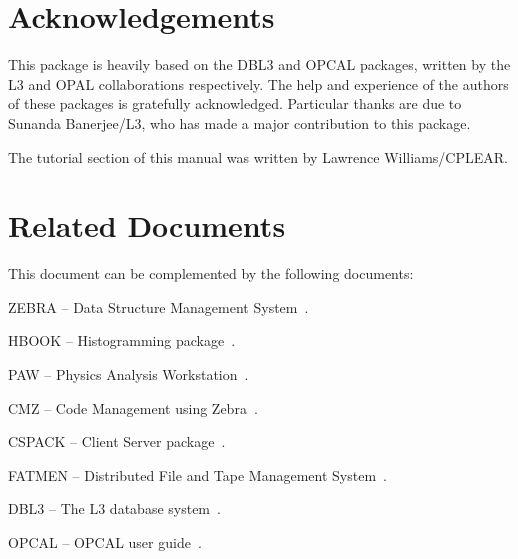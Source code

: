 \section*{Acknowledgements}

This package is heavily based on the DBL3 and OPCAL packages,
written by the L3 and OPAL collaborations respectively.
The help and experience of the authors of these packages
is gratefully acknowledged. Particular thanks are due to
Sunanda Banerjee/L3, who has made a major contribution to
this package.

The tutorial section of this manual was written by
Lawrence Williams/CPLEAR.

\section*{Related Documents}

This document can be complemented by the following documents:
\begin{UL}
\item ZEBRA -- Data Structure Management System~\cite{bib-ZEBRA}.
\item HBOOK -- Histogramming package~\cite{bib-HBOOK}.
\item PAW -- Physics Analysis Workstation~\cite{bib-PAW}.
\item CMZ -- Code Management using Zebra~\cite{bib-CMZ}.
\item CSPACK -- Client Server package~\cite{bib-CSPACK}.
\item FATMEN -- Distributed File and Tape Management System~\cite{bib-FATMEN}.
\item DBL3 -- The L3 database system~\cite{bib-DBL3}.
\item OPCAL -- OPCAL user guide~\cite{bib-OPCAL}.
\end{UL}


\tableofcontents
\listoftables
